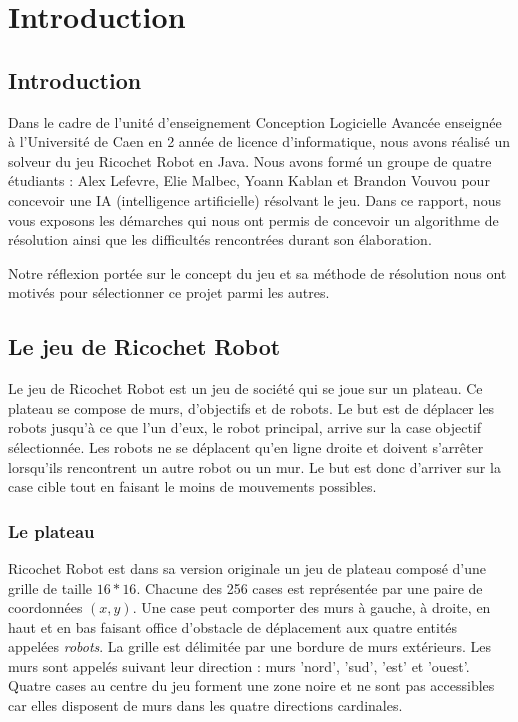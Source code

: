 \documentclass[a4paper]{article} %
\begin{document}
\section{Introduction}
	\subsection{Introduction}
Dans le cadre de l'unité d'enseignement Conception Logicielle Avancée enseignée à l'Université de Caen en 2 année de licence d'informatique, nous avons réalisé un solveur du jeu Ricochet Robot en Java. Nous avons formé un groupe de quatre étudiants : Alex Lefevre, Elie Malbec, Yoann Kablan et Brandon Vouvou pour concevoir une IA (intelligence artificielle) résolvant le jeu. Dans ce rapport, nous vous exposons les démarches qui nous ont permis de concevoir un algorithme de résolution ainsi que les difficultés rencontrées durant son élaboration.

Notre réflexion portée sur le concept du jeu et sa méthode de résolution nous ont motivés pour sélectionner ce projet parmi les autres.

	\subsection{Le jeu de Ricochet Robot}
Le jeu de Ricochet Robot est un jeu de société qui se joue sur un plateau. Ce plateau se compose de murs, d'objectifs et de robots. Le but est de déplacer les robots jusqu'à ce que l'un d'eux, le robot principal, arrive sur la case objectif sélectionnée. Les robots ne se déplacent qu'en ligne droite et doivent s'arrêter lorsqu'ils rencontrent un autre robot ou un mur. Le but est donc d'arriver sur la case cible tout en faisant le moins de mouvements possibles.
			\subsubsection{Le plateau}
Ricochet Robot est dans sa version originale un jeu de plateau composé d'une grille de taille $16*16$. Chacune des 256 cases est représentée par une paire de coordonnées $(x,y)$. Une case peut comporter des murs à gauche, à droite, en haut et en bas faisant office d'obstacle de déplacement aux quatre entités appelées \textit{robots}. La grille est délimitée par une bordure de murs extérieurs. Les murs sont appelés suivant leur direction : murs 'nord', 'sud', 'est' et 'ouest'. Quatre cases au centre du jeu forment une zone noire et ne sont pas accessibles car elles disposent de murs dans les quatre directions cardinales.
\end{document}
